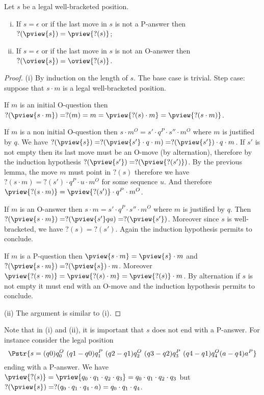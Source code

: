 \begin{lemma}
\label{lem:views_and_questionmarkfilter} Let $s$ be a legal
well-bracketed position.
\begin{enumerate}[(i)]
\item If $s=\epsilon$ or if the last move in $s$ is not a P-answer then $?(\pview{s}) = \pview{?(s)}$;
\item If $s=\epsilon$ or if the last move in $s$ is not an O-answer then $?(\oview{s}) = \oview{?(s)}$.
\end{enumerate}
\end{lemma}
\begin{proof}
(i) By induction on the length of $s$. The base case is trivial.
Step case: suppose that $s \cdot m$ is a legal well-bracketed position.

If $m$ is an initial O-question then $?(\pview{s \cdot m}) = ?(m) = m = \pview{?(s) \cdot m} = \pview{?(s \cdot m)}$.

If $m$ is a non initial O-question then
$s \cdot m^O = s' \cdot q^P \cdot s'' \cdot m^O$ where $m$ is justified by $q$.
We have $?(\pview{s}) = ?(\pview{s'} \cdot q \cdot  m) = ?(\pview{s'}) \cdot q \cdot m$.
If $s'$ is not empty then its last move must be an O-move (by alternation), therefore by the induction hypothesis
$?(\pview{s'})= ?(\pview{?(s')})$.
By the previous lemma, the move $m$ must point in $?(s)$ therefore we have
$?(s \cdot m) = ?(s') \cdot q^P \cdot u \cdot m^O$ for some sequence $u$. And therefore
$\pview{?(s \cdot m)} = \pview{?(s')} \cdot q^P \cdot m^O$.

If $m$ is an O-answer then $s \cdot m = s' \cdot q^P \cdot s'' \cdot m^O$ where $m$ is justified by $q$.
Then $?(\pview{s\cdot m}) = ?(\pview{s'} q a) = ?(\pview{s'})$.
Moreover since $s$ is well-bracketed, we have $?(s) = ?(s')$.
Again the induction hypothesis permits to conclude.

If $m$ is a P-question then $\pview{s \cdot m} = \pview{s} \cdot m$
and $?(\pview{s \cdot m}) = ?(\pview{s}) \cdot m$. Moreover
$\pview{?(s \cdot m)} = \pview{?(s) \cdot m} = \pview{?(s)} \cdot
m$. By alternation if $s$ is not empty it must end with an O-move
and the induction hypothesis permits to conclude.


(ii) The argument is similar to (i).
\end{proof}

Note that in (i) and (ii), it is important that $s$
does not end with a P-answer. For instance consider the legal
position
    $$\Pstr{s = (q0){q_0^O} \  (q1-q0){q_1^P} \ (q2-q1){q_2^O} \  (q3-q2){q_3^P} \ (q4-q1){q_4^O}
    (a-q4){a^P} }$$
 ending with a P-answer. We have $\pview{?(s)} =
\pview{q_0 \cdot q_1 \cdot q_2 \cdot q_3} = q_0 \cdot q_1 \cdot q_2
\cdot q_3$ but $?(\pview{s}) = ?(q_0 \cdot q_1 \cdot q_4 \cdot a) =
q_0 \cdot q_1 \cdot q_4$.


